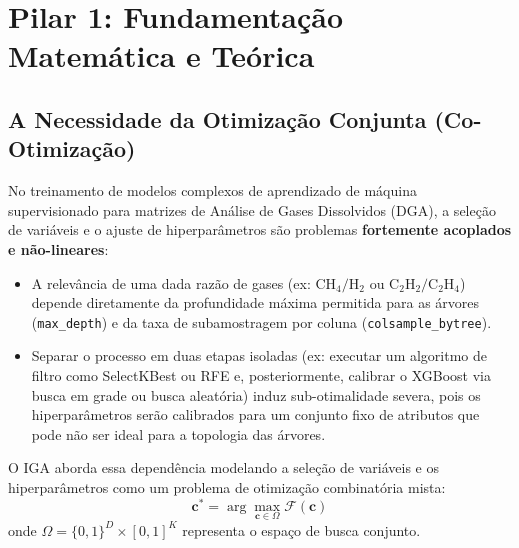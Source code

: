 \documentclass[11pt,a4paper]{article}
\begin{document}
\vspace{0.2cm}
\tableofcontents
\vspace{0.4cm}
\newpage

\section{Pilar 1: Fundamentação Matemática e Teórica}

\subsection{A Necessidade da Otimização Conjunta (Co-Otimização)}
No treinamento de modelos complexos de aprendizado de máquina supervisionado para matrizes de Análise de Gases Dissolvidos (DGA), a seleção de variáveis e o ajuste de hiperparâmetros são problemas \textbf{fortemente acoplados e não-lineares}:
\begin{itemize}
  \item A relevância de uma dada razão de gases (ex: $\text{CH}_4/\text{H}_2$ ou $\text{C}_2\text{H}_2/\text{C}_2\text{H}_4$) depende diretamente da profundidade máxima permitida para as árvores (\texttt{max\_depth}) e da taxa de subamostragem por coluna (\texttt{colsample\_bytree}).
  \item Separar o processo em duas etapas isoladas (ex: executar um algoritmo de filtro como SelectKBest ou RFE e, posteriormente, calibrar o XGBoost via busca em grade ou busca aleatória) induz sub-otimalidade severa, pois os hiperparâmetros serão calibrados para um conjunto fixo de atributos que pode não ser ideal para a topologia das árvores.
\end{itemize}

O IGA aborda essa dependência modelando a seleção de variáveis e os hiperparâmetros como um problema de otimização combinatória mista:
\begin{equation}
  \mathbf{c}^* = \arg\max_{\mathbf{c} \in \Omega} \mathcal{F}(\mathbf{c})
\end{equation}
onde $\Omega = \{0, 1\}^D \times [0, 1]^K$ representa o espaço de busca conjunto.
\end{document}
